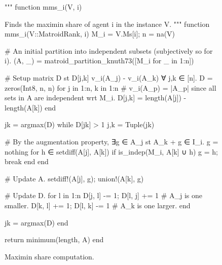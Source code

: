\begin{figure}
  \begin{jllisting}
"""
  function mms_i(V, i)

Finds the maximin share of agent i in the instance V.
"""
function mms_i(V::MatroidRank, i)
  M_i = V.Ms[i]; n = na(V)

  # An initial partition into independent subsets (subjectively so for i).
  (A, _) = matroid_partition_knuth73([M_i for _ in 1:n])

  # Setup matrix D st D[j,k] v_i(A_j) - v_i(A_k) ∀ j,k ∈ [n].
  D = zeros(Int8, n, n)
  for j in 1:n, k in 1:n
      # v_i(A_p) = |A_p| since all sets in A are independent wrt M_i.
      D[j,k] = length(A[j]) - length(A[k])
  end

  jk = argmax(D)
  while D[jk] > 1
      j,k = Tuple(jk)

      # By the augmentation property, ∃g ∈ A_j st A_k + g ∈ I_i.
      g = nothing
      for h ∈ setdiff(A[j], A[k]) 
          if is_indep(M_i, A[k] ∪ h)
              g = h; break
          end 
      end

      # Update A.
      setdiff!(A[j], g); union!(A[k], g)

      # Update D.
      for l in 1:n
          D[j, l] -= 1; D[l, j] += 1 # A_j is one smaller.
          D[k, l] += 1; D[l, k] -= 1 # A_k is one larger.
      end

      jk = argmax(D)
  end
  
  return minimum(length, A)
end
  \end{jllisting}
  \caption{Maximin share computation.}
  \label{code:mms_i}
\end{figure}